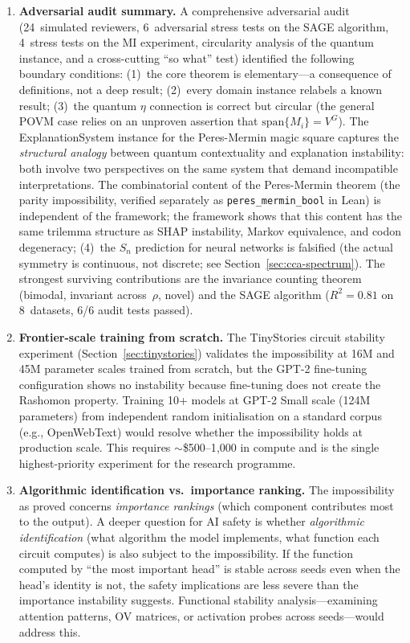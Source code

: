 \documentclass[11pt,a4paper]{article}
\begin{document}
\begin{enumerate}[label=(\arabic*)]
  \item \textbf{Adversarial audit summary.}  A comprehensive adversarial
    audit (24~simulated reviewers, 6~adversarial stress tests on the SAGE
    algorithm, 4~stress tests on the MI experiment, circularity analysis
    of the quantum instance, and a cross-cutting ``so what'' test)
    identified the following boundary conditions: (1)~the core theorem is
    elementary---a consequence of definitions, not a deep result;
    (2)~every domain instance relabels a known result; (3)~the quantum
    $\eta$ connection is correct but circular (the general POVM case
    relies on an unproven assertion that $\mathrm{span}\{M_i\} = V^G$).
    The ExplanationSystem instance for the Peres-Mermin magic square captures the \emph{structural analogy} between quantum contextuality and explanation instability: both involve two perspectives on the same system that demand incompatible interpretations.  The combinatorial content of the Peres-Mermin theorem (the parity impossibility, verified separately as \texttt{peres\_mermin\_bool} in Lean) is independent of the framework; the framework shows that this content has the same trilemma structure as SHAP instability, Markov equivalence, and codon degeneracy;
    (4)~the $S_n$ prediction for neural networks is falsified (the actual
    symmetry is continuous, not discrete; see
    Section~\ref{sec:cca-spectrum}).  The strongest surviving
    contributions are the invariance counting theorem (bimodal, invariant
    across~$\rho$, novel) and the SAGE algorithm ($R^2 = 0.81$ on
    8~datasets, 6/6 audit tests passed).
  \item \textbf{Frontier-scale training from scratch.}  The TinyStories circuit stability experiment (Section~\ref{sec:tinystories}) validates the impossibility at 16M and 45M parameter scales trained from scratch, but the GPT-2 fine-tuning configuration shows no instability because fine-tuning does not create the Rashomon property.  Training 10+ models at GPT-2 Small scale (124M parameters) from independent random initialisation on a standard corpus (e.g., OpenWebText) would resolve whether the impossibility holds at production scale.  This requires $\sim$\$500--1{,}000 in compute and is the single highest-priority experiment for the research programme.
  \item \textbf{Algorithmic identification vs.\ importance ranking.}  The impossibility as proved concerns \emph{importance rankings} (which component contributes most to the output).  A deeper question for AI safety is whether \emph{algorithmic identification} (what algorithm the model implements, what function each circuit computes) is also subject to the impossibility.  If the function computed by ``the most important head'' is stable across seeds even when the head's identity is not, the safety implications are less severe than the importance instability suggests.  Functional stability analysis---examining attention patterns, OV matrices, or activation probes across seeds---would address this.

\end{enumerate}
\end{document}
